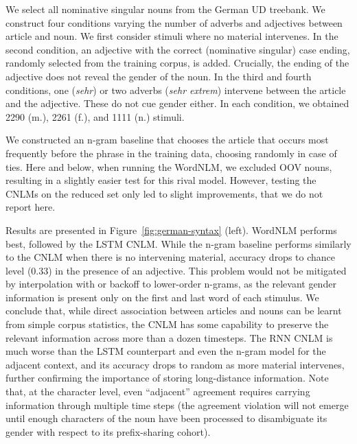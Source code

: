 We select all nominative singular nouns from the German UD treebank. %
We construct four conditions varying the number of adverbs and adjectives between  article and noun.
We first consider stimuli where no material intervenes. %
In the second condition, an adjective with the correct (nominative singular) case ending, randomly selected from the training corpus, is added. Crucially, the ending of the adjective does not reveal the gender of the noun.
In the third and fourth conditions, one (\emph{sehr}) or two adverbs (\emph{sehr extrem}) intervene between the article and the adjective. These do not cue gender either. In each condition, we obtained 2290 (m.), 2261 (f.), and 1111 (n.) stimuli.

We constructed an n-gram baseline that chooses the article that occurs
most frequently before the phrase in the training data, choosing
randomly in case of ties. Here and below, when running the
WordNLM, we excluded OOV nouns, resulting in a slightly easier test
for this rival model. However, testing the CNLMs on the reduced set
only led to slight improvements, that we do not report here.

Results are presented in Figure~\ref{fig:german-syntax}
(left). WordNLM performs best, followed by the LSTM CNLM.  While the
n-gram baseline performs similarly to the CNLM when there is no
intervening material, accuracy drops to chance level (0.33) in the
presence of an adjective. This problem would not be mitigated by
interpolation with or backoff to lower-order n-grams, as the relevant
gender information is present only on the first and last word of each
stimulus. We conclude that, while direct association between articles
and nouns can be learnt from simple corpus statistics, the CNLM has
some capability to preserve the relevant information across more than
a dozen timesteps. The RNN CNLM is much worse than the LSTM
counterpart and even the n-gram model for the adjacent context, and
its accuracy drops to random as more material intervenes, further
confirming the importance of storing long-distance information. Note
that, at the character level, even ``adjacent'' agreement requires
carrying information through multiple time steps (the agreement
violation will not emerge until enough characters of the noun have
been processed to disambiguate its gender with respect to its
prefix-sharing cohort).

